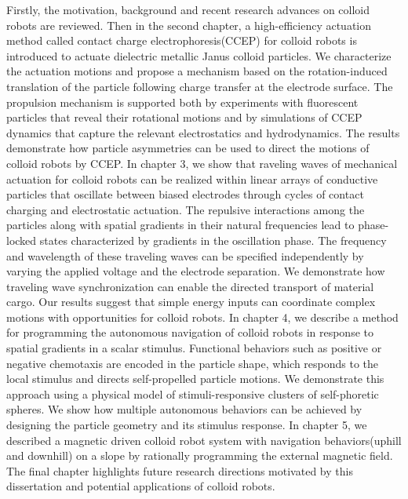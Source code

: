 \begin{titlepage}
Firstly, the motivation, background and recent research  advances on colloid robots are reviewed. Then in the second chapter, a high-efficiency  actuation method called contact charge electrophoresis(CCEP) for colloid robots is introduced to actuate dielectric metallic Janus colloid particles. We characterize the actuation motions and propose a mechanism based on the rotation-induced translation of the particle following charge transfer at the electrode surface. The propulsion mechanism is supported both by experiments with fluorescent particles that reveal their rotational motions and by simulations of CCEP dynamics that capture the relevant electrostatics and hydrodynamics. The results demonstrate how particle asymmetries can be used to direct the motions of colloid robots by CCEP. In chapter 3, we show that raveling waves of mechanical actuation for colloid robots can be realized within linear arrays of conductive particles that oscillate between biased electrodes through cycles of contact charging and electrostatic actuation. The repulsive interactions among the particles along with spatial gradients in their natural frequencies lead to phase-locked states characterized by gradients in the oscillation phase. The frequency and wavelength of these traveling waves can be specified independently by varying the applied voltage and the electrode separation. We demonstrate how traveling wave synchronization can enable the directed transport of material cargo. Our results suggest that simple energy inputs can coordinate complex motions with opportunities for colloid robots. In chapter 4, we describe a method for programming the autonomous navigation of colloid robots in response to spatial gradients in a scalar stimulus. Functional behaviors such as positive or negative chemotaxis are encoded in the particle shape, which responds to the local stimulus and directs self-propelled particle motions. We demonstrate this approach using a physical model of stimuli-responsive clusters of self-phoretic spheres. We show how multiple autonomous behaviors can be achieved by designing the particle geometry and its stimulus response. In chapter 5, we described a magnetic driven colloid robot system with navigation behaviors(uphill and downhill) on a slope by rationally  programming the external magnetic field. 
The final chapter  highlights future research  directions motivated by this dissertation and potential applications of colloid robots.

\vspace*{\fill}
\end{titlepage}
